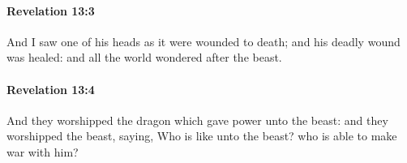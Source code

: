 		\paragraph{Revelation 13:3} %
			\label{REVELATIONNT-13-3}

			And I saw one of his heads as it were wounded to death; and his deadly wound was healed: and all the world wondered after the beast.

			\begin{framed}
			\scriptsize
				\begin{compactdesc}
					\item[SBLG] 
				\end{compactdesc}
			\end{framed}

		\paragraph{Revelation 13:4} %
			\label{REVELATIONNT-13-4}

			And they worshipped the dragon which gave power unto the beast: and they worshipped the beast, saying, Who is like unto the beast? who is able to make war with him?

